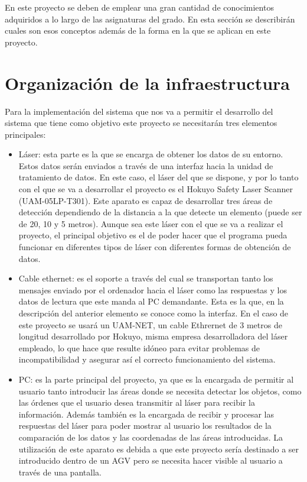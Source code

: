 
En este proyecto se deben de emplear una gran cantidad de  conocimientos adquiridos a lo largo de las asignaturas del grado. En esta sección se describirán cuales son esos conceptos además de la forma en la que se aplican en este proyecto.

\section{Organización de la infraestructura}

Para la implementación del sistema que nos va a permitir el desarrollo del sistema que tiene como objetivo este proyecto se necesitarán tres elementos principales:
\begin{itemize}
	 \item Láser: esta parte es la que se encarga de obtener los datos de su entorno. Estos datos serán enviados a través de una interfaz hacia la unidad de tratamiento de datos. En este caso, el láser del que se dispone, y por lo tanto con el que se va a desarrollar el proyecto es el Hokuyo Safety Laser Scanner (UAM-05LP-T301). Este aparato es capaz de desarrollar tres áreas de detección dependiendo de la distancia a la que detecte un elemento (puede ser de 20, 10 y 5 metros). Aunque sea este láser con el que se va a realizar el proyecto, el principal objetivo es el de poder hacer que el programa pueda funcionar en diferentes tipos de láser con diferentes formas de obtención de datos.\\
    \item Cable ethernet: es el soporte a través del cual se transportan tanto los mensajes enviado por el ordenador hacia el láser como las respuestas y los datos de lectura que este manda al PC demandante. Esta es la que, en la descripción del anterior elemento se conoce como la interfaz. En el caso de este proyecto se usará un UAM-NET, un cable Ethrernet de 3 metros de longitud desarrollado por Hokuyo, misma empresa desarrolladora del láser empleado, lo que hace que resulte idóneo para evitar problemas de incompatibilidad y asegurar así el correcto funcionamiento del sistema.
    \item PC: es la parte principal del proyecto, ya que es la encargada de permitir al usuario tanto introducir las áreas donde se necesita detectar los objetos, como las órdenes que el usuario desea transmitir al láser para recibir la información. Además también es la encargada de recibir y procesar las respuestas del láser para poder mostrar al usuario los resultados de la comparación de los datos y las coordenadas de las áreas introducidas. La utilización de este aparato es debida a que este proyecto sería destinado a ser introducido dentro de un AGV pero se necesita hacer visible al usuario a través de una pantalla.\\ 
\end{itemize}


